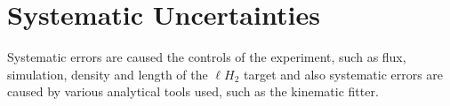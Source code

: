 \section{\label{sec:level1}Systematic Uncertainties}
 Systematic errors are caused the controls of the experiment, such as flux, simulation, density and length of the $\ell H_2$ target and also systematic errors are caused by various analytical tools used, such as the kinematic fitter.
 	
 	 	
 	 	
 	 	
 	 	
 	 	
 	 	

 				